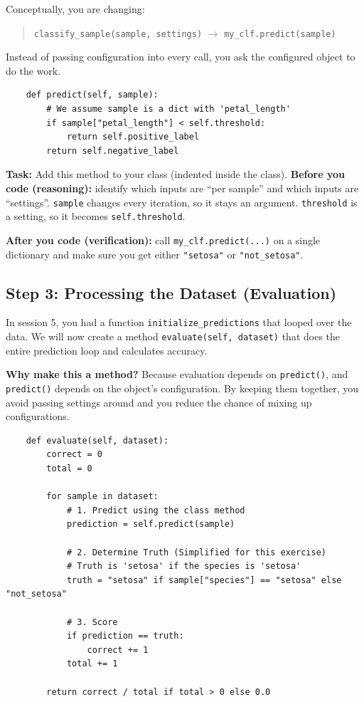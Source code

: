 \noindent
Conceptually, you are changing:
\begin{quote}
\texttt{classify\_sample(sample, settings)} $\rightarrow$ \texttt{my\_clf.predict(sample)}
\end{quote}
Instead of passing configuration into every call, you ask the configured object to do the work.

\begin{verbatim}
    def predict(self, sample):
        # We assume sample is a dict with 'petal_length'
        if sample["petal_length"] < self.threshold:
            return self.positive_label
        return self.negative_label
\end{verbatim}

\noindent
\textbf{Task:} Add this method to your class (indented inside the class).
\noindent
\textbf{Before you code (reasoning):} identify which inputs are ``per sample'' and which inputs are ``settings''.
\texttt{sample} changes every iteration, so it stays an argument. \texttt{threshold} is a setting, so it becomes \texttt{self.threshold}.

\noindent
\textbf{After you code (verification):} call \texttt{my\_clf.predict(...)} on a single dictionary and make sure you get either \texttt{"setosa"} or \texttt{"not\_setosa"}.

\subsection{Step 3: Processing the Dataset (Evaluation)}
In session 5, you had a function \texttt{initialize\_predictions} that looped over the data.
We will now create a method \texttt{evaluate(self, dataset)} that does the entire prediction loop and calculates accuracy.

\noindent
\textbf{Why make this a method?}
Because evaluation depends on \texttt{predict()}, and \texttt{predict()} depends on the object's configuration.
By keeping them together, you avoid passing settings around and you reduce the chance of mixing up configurations.

\begin{verbatim}
    def evaluate(self, dataset):
        correct = 0
        total = 0
        
        for sample in dataset:
            # 1. Predict using the class method
            prediction = self.predict(sample)
            
            # 2. Determine Truth (Simplified for this exercise)
            # Truth is 'setosa' if the species is 'setosa'
            truth = "setosa" if sample["species"] == "setosa" else "not_setosa"
            
            # 3. Score
            if prediction == truth:
                correct += 1
            total += 1
            
        return correct / total if total > 0 else 0.0
\end{verbatim}


